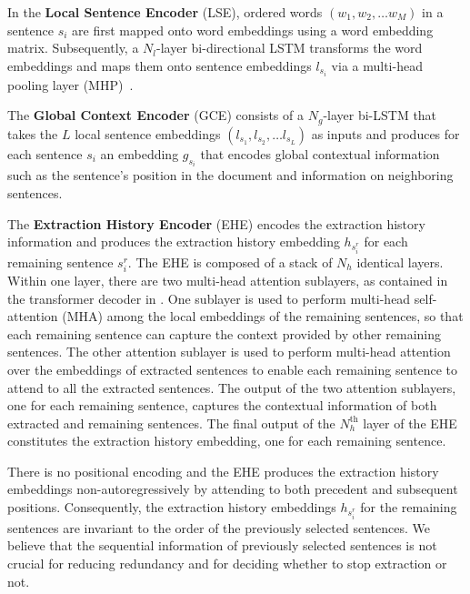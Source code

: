 \documentclass[11pt]{article}
\begin{document}
In the \textbf{Local Sentence Encoder} (LSE), ordered words $(w_1, w_2, \dots w_M)$ in a sentence $s_i$ are first mapped onto word embeddings using a word embedding matrix. Subsequently, a $N_l$-layer bi-directional LSTM \cite{hochreiter1997long} transforms the word embeddings and maps them onto sentence embeddings $l_{s_i}$ via a multi-head pooling layer (MHP)~\cite{liu2019hierarchical}.


The \textbf{Global Context Encoder} (GCE) consists of a $N_g$-layer bi-LSTM that takes the $L$ local sentence embeddings $(l_{s_1}, l_{s_2}, \dots l_{s_L})$ as inputs and produces for each sentence $s_i$ an embedding $g_{s_i}$ that encodes global contextual information such as the sentence's position in the document and information on neighboring sentences.


The \textbf{Extraction History Encoder} (EHE) encodes the extraction history information and produces the extraction history embedding $h_{s^r_i}$ for each remaining sentence $s^r_i$.
The EHE is composed of a stack of $N_h$ identical layers. Within one layer, there are two multi-head attention sublayers, as contained in the transformer decoder in \citet{vaswani2017attention}. One  sublayer is used to perform multi-head self-attention (MHA) among the local embeddings of the remaining sentences, so that each remaining sentence can capture the context provided by other remaining sentences. The other attention sublayer is used to perform multi-head attention over the embeddings of extracted sentences to enable each remaining sentence to attend to all the extracted sentences. The output of the two attention sublayers, one for each remaining sentence, captures the contextual information of both extracted and remaining sentences. The final output of the $N_h^{\text{th}}$ layer of the EHE constitutes the extraction history embedding, one for each remaining sentence. 

There is no positional encoding and the EHE produces the extraction history embeddings non-autoregressively by attending to both precedent and subsequent positions. Consequently, the extraction history embeddings $h_{s^r_i}$  for the remaining sentences are invariant to the order of the previously selected sentences. We believe that the sequential information of previously selected sentences is not crucial for reducing redundancy and for deciding whether to stop extraction or not.
\end{document}
